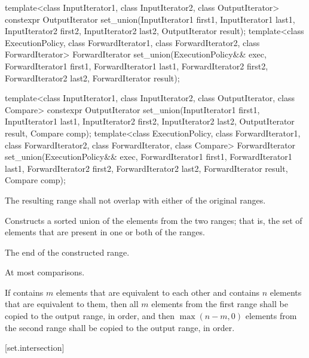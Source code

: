 %
\begin{itemdecl}
template<class InputIterator1, class InputIterator2,
         class OutputIterator>
  constexpr OutputIterator
    set_union(InputIterator1 first1, InputIterator1 last1,
              InputIterator2 first2, InputIterator2 last2,
              OutputIterator result);
template<class ExecutionPolicy, class ForwardIterator1, class ForwardIterator2,
         class ForwardIterator>
  ForwardIterator
    set_union(ExecutionPolicy&& exec,
              ForwardIterator1 first1, ForwardIterator1 last1,
              ForwardIterator2 first2, ForwardIterator2 last2,
              ForwardIterator result);

template<class InputIterator1, class InputIterator2,
         class OutputIterator, class Compare>
  constexpr OutputIterator
    set_union(InputIterator1 first1, InputIterator1 last1,
              InputIterator2 first2, InputIterator2 last2,
              OutputIterator result, Compare comp);
template<class ExecutionPolicy, class ForwardIterator1, class ForwardIterator2,
         class ForwardIterator, class Compare>
  ForwardIterator
    set_union(ExecutionPolicy&& exec,
              ForwardIterator1 first1, ForwardIterator1 last1,
              ForwardIterator2 first2, ForwardIterator2 last2,
              ForwardIterator result, Compare comp);
\end{itemdecl}

\begin{itemdescr}
\pnum
\requires
The resulting range shall not overlap with either of the original ranges.

\pnum
\effects
Constructs a sorted union of the elements from the two ranges;
that is, the set of elements that are present in one or both of the ranges.

\pnum
\returns
The end of the constructed range.

\pnum
\complexity
At most
comparisons.

\pnum
\remarks If  contains $m$ elements that are equivalent to
each other and  contains $n$ elements that are equivalent
to them, then all $m$ elements from the first range shall be copied to the output
range, in order, and then $\max(n - m, 0)$ elements from the second range shall
be copied to the output range, in order.
\end{itemdescr}

[set.intersection]{}

